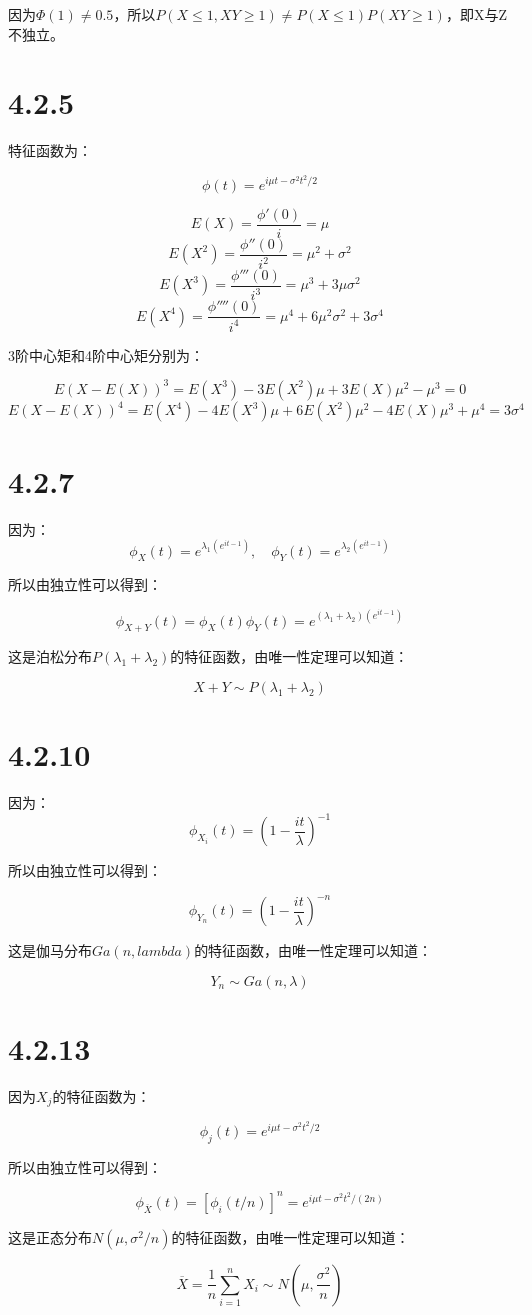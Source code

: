 \documentclass{article}
\begin{document}
因为$\Phi(1)\neq0.5$，所以$P(X\leq 1, XY\geq1)\neq P(X\leq 1)P(XY\geq1)$，即X与Z不独立。


\section{4.2.5}

特征函数为：

$$\phi (t)=e^{i\mu t -\sigma^2t^2/2}$$

$$E(X)=\frac{\phi'(0)}{i}=\mu$$
$$E(X^2)=\frac{\phi''(0)}{i^2}=\mu^2+\sigma^2$$
$$E(X^3)=\frac{\phi'''(0)}{i^3}=\mu^3+3\mu\sigma^2$$
$$E(X^4)=\frac{\phi''''(0)}{i^4}=\mu^4+6\mu^2\sigma^2+3\sigma^4$$

3阶中心矩和4阶中心矩分别为：

$$E(X-E(X))^3=E(X^3)-3E(X^2)\mu+3E(X)\mu^2-\mu^3=0$$
$$E(X-E(X))^4=E(X^4)-4E(X^3)\mu+6E(X^2)\mu^2-4E(X)\mu^3+\mu^4=3\sigma^4$$
\section{4.2.7}
因为：
$$\phi_X(t)=e^{\lambda_1(e^{it-1})},\quad \phi_Y(t)=e^{\lambda_2(e^{it-1})}$$

所以由独立性可以得到：

$$\phi_{X+Y}(t)=\phi_X(t)\phi_Y(t)=e^{(\lambda_1+\lambda_2)(e^{it-1})}$$

这是泊松分布$P(\lambda_1+\lambda_2)$的特征函数，由唯一性定理可以知道：

$$X+Y\sim P(\lambda_1+\lambda_2)$$
\section{4.2.10}
因为：
$$\phi_{X_i}(t)=(1-\frac{it}{\lambda})^{-1}$$

所以由独立性可以得到：

$$\phi_{Y_n}(t)=(1-\frac{it}{\lambda})^{-n}$$

这是伽马分布$Ga(n,lambda)$的特征函数，由唯一性定理可以知道：

$$Y_n\sim Ga(n,\lambda)$$

\section{4.2.13}

因为$X_j$的特征函数为：

$$\phi_j(t)=e^{i\mu t-\sigma^2t^2/2}$$

所以由独立性可以得到：

$$\phi_{\overline X}(t)=[\phi_i(t/n)]^n=e^{i\mu t-\sigma^2t^2/(2n)}$$

这是正态分布$N(\mu, \sigma^2/n)$的特征函数，由唯一性定理可以知道：

$$\overline X=\frac1n\sum^n_{i=1}X_i \sim N(\mu, \frac{\sigma^2}{n})$$
\end{document}
